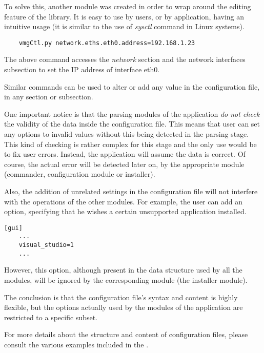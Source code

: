 To solve this, another module was created in order to wrap around the editing 
feature of the library. It is easy to use by users, or by application, having 
an intuitive usage (it is similar to the use of \emph{sysctl} command in Linux 
systems).
\\
\lstset{language=Python,caption=Editing the configuration file,
label=lst:edit-conf}
\begin{lstlisting}
	vmgCtl.py network.eths.eth0.address=192.168.1.23
\end{lstlisting}

The above command accesses the \emph{network} section and the network 
interfaces subsection to set the IP address of interface eth0.

Similar commands can be used to alter or add any value in the configuration file, in 
any section or subsection.

One important notice is that the parsing modules of the application \emph{do not 
check} the validity of the data inside the configuration file. This means that 
user can set any options to invalid values without this being detected in the 
parsing stage. This kind of checking is rather complex for this stage and the
only use would be to fix user errors. Instead, the application will assume the data 
is correct. Of course, the actual error will be detected later on, by the 
appropriate module (commander, configuration module or installer).

Also, the addition of unrelated settings in the configuration file will not 
interfere with the operations of the other modules. For example, the user can 
add an option, specifying that he wishes a certain unsupported application 
installed.
\\
\lstset{language=Python,caption=Editing the configuration file,
label=lst:unsupported-setting}
\begin{lstlisting}
[gui]
	...
	visual_studio=1
	...
\end{lstlisting}
However, this option, although present in the data structure used by all the 
modules, will be ignored by the corresponding module (the installer module).

The conclusion is that the configuration file's syntax and content is 
highly flexible, but the options actually used by the modules of the 
application are restricted to a specific subset.

For more details about the structure and content of configuration files, please 
consult the various examples included in the .